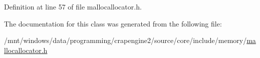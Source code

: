Definition at line 57 of file mallocallocator.\+h.



The documentation for this class was generated from the following file\+:\begin{DoxyCompactItemize}
\item 
/mnt/windows/data/programming/crapengine2/source/core/include/memory/\hyperlink{mallocallocator_8h}{mallocallocator.\+h}\end{DoxyCompactItemize}
